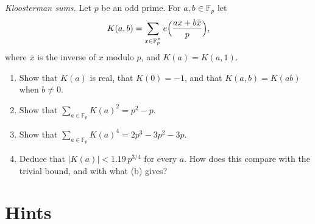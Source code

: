 \begin{exercise}[$\star\star\star$]\label{pb:kloosterman}
\emph{Kloosterman sums.} Let $p$ be an odd prime. For $a,b\in\mathbb F_p$ let
\[
K(a,b)=\sum_{x\in\mathbb F_p^\times}e\Bigl(\frac{ax+b\bar x}p\Bigr),
\]
where $\bar x$ is the inverse of $x$ modulo $p$, and $K(a)=K(a,1)$.
\begin{enumerate}[label=(\alph*)]
\item Show that $K(a)$ is real, that $K(0)=-1$, and that $K(a,b)=K(ab)$ when $b\ne0$.
\item Show that $\sum_{a\in\mathbb F_p}K(a)^2=p^2-p$.
\item Show that $\sum_{a\in\mathbb F_p}K(a)^4=2p^3-3p^2-3p$.
\item Deduce that $|K(a)|<1.19\,p^{3/4}$ for every $a$. How does this compare with the trivial bound, and with what (b) gives?
\end{enumerate}
\end{exercise}

\section{Hints}

